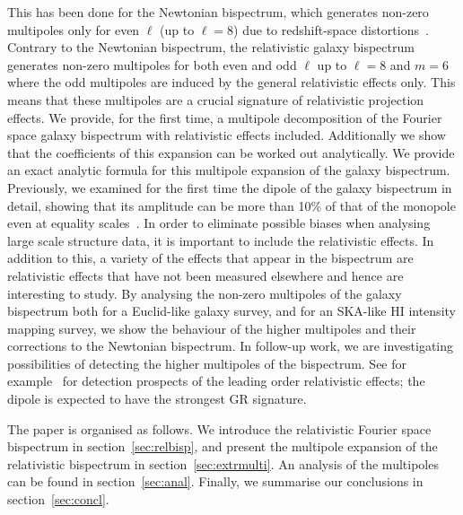 This has been done for the Newtonian bispectrum, which generates non-zero multipoles only for even 
\(\ell\) (up to \(\ell = 8\)) due to redshift-space distortions~\cite{Scoccimarro:1999ed,Nan:2017oaq}. Contrary to the Newtonian bispectrum, the relativistic galaxy bispectrum generates non-zero multipoles for both even and odd \(\ell\) up to \(\ell = 8\) and \(m = 6\) where the odd multipoles are induced by the general relativistic effects only. This means that these multipoles are a crucial signature of relativistic projection effects. We provide, for the first time, a multipole decomposition of the Fourier space galaxy bispectrum with relativistic effects included. Additionally we show that the coefficients of this expansion can be worked out analytically. We provide an exact analytic formula for this multipole expansion of the galaxy bispectrum. Previously, we examined for the first time the dipole of the galaxy bispectrum in detail, showing that its amplitude can be more than 10\% of that of the monopole even at equality scales~\cite{Clarkson:2018dwn}. 
In order to eliminate possible biases when analysing large scale structure data, it is important to include the relativistic effects. In addition to this, a variety of the effects that appear in the bispectrum are relativistic effects that have not been measured elsewhere and hence are interesting to study. By analysing the non-zero multipoles of the galaxy bispectrum both for a Euclid-like galaxy survey, and for an SKA-like HI intensity mapping survey, we show the behaviour of the higher multipoles and their corrections to the Newtonian bispectrum. In follow-up work, we are investigating possibilities of detecting the higher multipoles of the bispectrum. See for example~\cite{Maartens:2019yhx} for detection prospects of the leading order relativistic effects; the dipole is expected to have the strongest GR signature. 

The paper is organised as follows. We introduce the relativistic Fourier space bispectrum in section~\ref{sec:relbisp}, and present the multipole expansion of the relativistic bispectrum in section~\ref{sec:extrmulti}. An analysis of the multipoles can be found in section~\ref{sec:anal}. Finally, we summarise our conclusions in section~\ref{sec:concl}.


